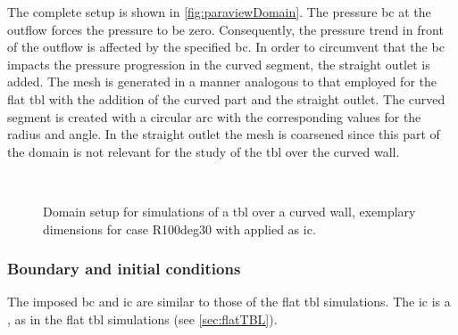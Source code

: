 The complete setup is shown in \autoref{fig:paraviewDomain}.
The pressure \acrshort{bc} at the outflow forces the pressure to be zero.
Consequently, the pressure trend in front of the outflow is affected by the specified \acrlong{bc}.
In order to circumvent that the \acrshort{bc} impacts the pressure progression in the curved segment, the straight outlet is added.
The mesh is generated in a manner analogous to that employed for the flat \acrshort{tbl} with the addition of the curved part and the straight outlet.
The curved segment is created with a circular arc with the corresponding values for the radius and angle.
In the straight outlet the mesh is coarsened since this part of the domain is not relevant for the study of the \acrshort{tbl} over the curved wall. \\

\begin{figure}[h!]
    \centering
    
    \\[-15pt]
    \caption{Domain setup for simulations of a \acrshort{tbl} over a curved wall, exemplary dimensions for case R100deg30 with applied  as \acrshort{ic}.}
    \label{fig:paraviewDomain}
\end{figure}

\subsubsection{Boundary and initial conditions}
The imposed \acrshort{bc} and \acrfull{ic} are similar to those of the flat \acrshort{tbl} simulations.
The \acrshort{ic} is a , as in the flat \acrshort{tbl} simulations (see \autoref{sec:flatTBL}).

